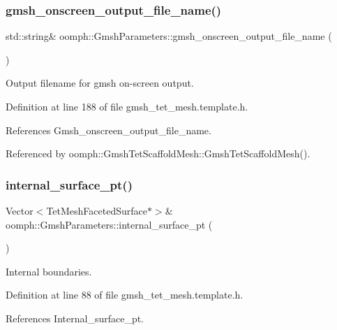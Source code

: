 \subsubsection{\texorpdfstring{gmsh\+\_\+onscreen\+\_\+output\+\_\+file\+\_\+name()}{gmsh\_onscreen\_output\_file\_name()}}
{\footnotesize\ttfamily std\+::string\& oomph\+::\+Gmsh\+Parameters\+::gmsh\+\_\+onscreen\+\_\+output\+\_\+file\+\_\+name (\begin{DoxyParamCaption}{ }\end{DoxyParamCaption})\hspace{0.3cm}{\ttfamily [inline]}}



Output filename for gmsh on-\/screen output. 



Definition at line 188 of file gmsh\+\_\+tet\+\_\+mesh.\+template.\+h.



References Gmsh\+\_\+onscreen\+\_\+output\+\_\+file\+\_\+name.



Referenced by oomph\+::\+Gmsh\+Tet\+Scaffold\+Mesh\+::\+Gmsh\+Tet\+Scaffold\+Mesh().

\mbox{\label{classoomph_1_1GmshParameters_a10f845ea8fb16bf617f5c6ca05e21bf9}} 
\subsubsection{\texorpdfstring{internal\+\_\+surface\+\_\+pt()}{internal\_surface\_pt()}}
{\footnotesize\ttfamily Vector$<$Tet\+Mesh\+Faceted\+Surface$\ast$$>$\& oomph\+::\+Gmsh\+Parameters\+::internal\+\_\+surface\+\_\+pt (\begin{DoxyParamCaption}{ }\end{DoxyParamCaption})\hspace{0.3cm}{\ttfamily [inline]}}



Internal boundaries. 



Definition at line 88 of file gmsh\+\_\+tet\+\_\+mesh.\+template.\+h.



References Internal\+\_\+surface\+\_\+pt.



